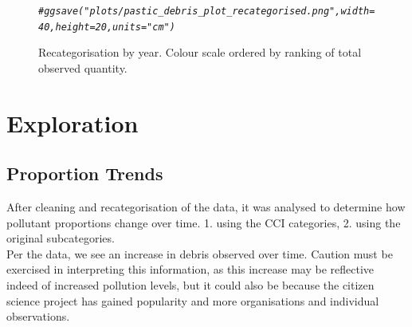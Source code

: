 \documentclass[10pt]{article}\usepackage[]{graphicx}\usepackage[]{color}
\makeatletter
\newcommand{\hlcom}[1]{\textcolor[rgb]{0.678,0.584,0.686}{\textit{#1}}}%
\newenvironment{kframe}{%
 \def\at@end@of@kframe{}%
 \ifinner\ifhmode%
  \def\at@end@of@kframe{\end{minipage}}%
  \begin{minipage}{\columnwidth}%
 \fi\fi%
 \def\FrameCommand##1{\hskip\@totalleftmargin \hskip-\fboxsep
 \colorbox{shadecolor}{##1}\hskip-\fboxsep
     \hskip-\linewidth \hskip-\@totalleftmargin \hskip\columnwidth}%
 \MakeFramed {\advance\hsize-\width
   \@totalleftmargin\z@ \linewidth\hsize
   \@setminipage}}%
 {\par\unskip\endMakeFramed%
 \at@end@of@kframe}
\newenvironment{knitrout}{}{} %
\makeatother
\begin{document}
\begin{figure}[H]
\begin{center}
\begin{knitrout}
\begin{kframe}\begin{alltt}
\hlcom{#ggsave("plots/pastic_debris_plot_recategorised.png", width = 40, height = 20, units = "cm")}
\end{alltt}
\end{kframe}
\end{knitrout}
\caption {Recategorisation by year. Colour scale ordered by ranking of total observed quantity.}
\label{figB}
\end {center}
\end {figure}


















\pagebreak
\section{Exploration}



\subsection{Proportion Trends}
After cleaning and recategorisation of the data, it was analysed to determine how pollutant proportions change over time. 1. using the CCI categories, 2. using the original subcategories.\\

Per the data, we see an increase in debris observed over time. Caution must be exercised in interpreting this information, as this increase may be reflective indeed of increased pollution levels, but it could also be because the citizen science project has gained popularity and more organisations and individual observations.
\end{document}
